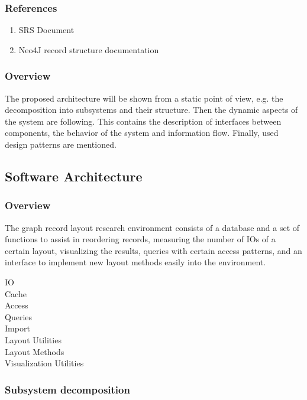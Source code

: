 		\subsubsection{References}
			\begin{enumerate}
				\item SRS Document
				\item Neo4J record structure documentation
			\end{enumerate}
			
		\subsubsection{Overview}
			The proposed architecture will be shown from a static point of view, e.g. the decomposition into subsystems and their structure. Then the dynamic aspects of the system are following. This contains the description of interfaces between components, the behavior of the system and information flow. Finally, used design patterns are mentioned.
			
			
	\subsection{Software Architecture}
		\subsubsection{Overview}
		The graph record layout research environment consists of a database and a set of functions to assist in reordering records, measuring the number of IOs of a certain layout, visualizing the results, queries with certain access patterns, and an interface to implement new layout methods easily into the environment.
			\begin{description}
				\item [IO] 
				\item [Cache]
				\item [Access] 
				\item [Queries] 
				\item [Import] 
				\item [Layout Utilities] 
				\item [Layout Methods] 
				\item [Visualization Utilities]
			\end{description}
			
		\subsubsection{Subsystem decomposition}

